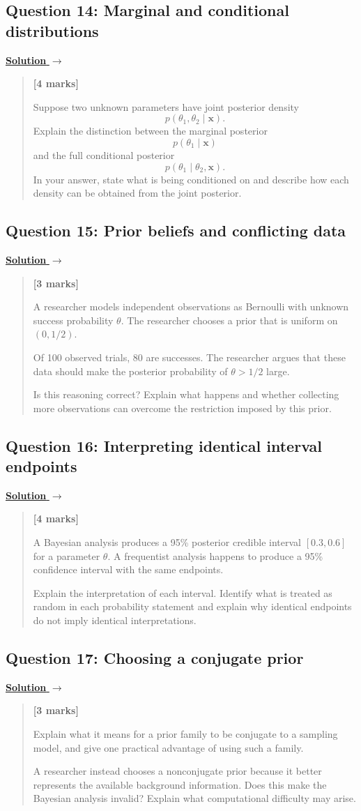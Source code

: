 \documentclass[11pt,a4paper]{article}
\newcommand{\xvec}{\boldsymbol{x}}
\newenvironment{examquestion}[2]
  {\subsection{#1}\label{question:\arabic{subsection}}\label{#2}%
   \noindent\hyperref[answer:\arabic{subsection}]{\textbf{Solution} $\rightarrow$}%
   \begin{quote}\color{statgrey}}
  {\end{quote}}
\begin{document}
\clearpage

\begin{examquestion}{Question 14: Marginal and conditional distributions}{question:practice-marginal-and-conditional-distributions}
\textbf{[4 marks]}

Suppose two unknown parameters have joint posterior density
\[
p(\theta_1,\theta_2\mid\xvec).
\]
Explain the distinction between the marginal posterior
\[
p(\theta_1\mid\xvec)
\]
and the full conditional posterior
\[
p(\theta_1\mid\theta_2,\xvec).
\]
In your answer, state what is being conditioned on and describe how each
density can be obtained from the joint posterior.
\end{examquestion}

\clearpage

\begin{examquestion}{Question 15: Prior beliefs and conflicting data}{question:practice-prior-beliefs-and-conflicting-data}
\textbf{[3 marks]}

A researcher models independent observations as Bernoulli with unknown
success probability $\theta$. The researcher chooses a prior that is uniform
on $(0,1/2)$.

Of 100 observed trials, 80 are successes. The researcher argues that these
data should make the posterior probability of $\theta>1/2$ large.

Is this reasoning correct? Explain what happens and whether collecting more
observations can overcome the restriction imposed by this prior.
\end{examquestion}

\clearpage

\begin{examquestion}{Question 16: Interpreting identical interval endpoints}{question:practice-interpreting-identical-interval-endpoints}
\textbf{[4 marks]}

A Bayesian analysis produces a 95\% posterior credible interval $[0.3,0.6]$
for a parameter $\theta$. A frequentist analysis happens to produce a 95\%
confidence interval with the same endpoints.

Explain the interpretation of each interval. Identify what is treated as
random in each probability statement and explain why identical endpoints do
not imply identical interpretations.
\end{examquestion}

\clearpage

\begin{examquestion}{Question 17: Choosing a conjugate prior}{question:practice-choosing-a-conjugate-prior}
\textbf{[3 marks]}

Explain what it means for a prior family to be conjugate to a sampling model,
and give one practical advantage of using such a family.

A researcher instead chooses a nonconjugate prior because it better
represents the available background information. Does this make the Bayesian
analysis invalid? Explain what computational difficulty may arise.
\end{examquestion}
\end{document}
